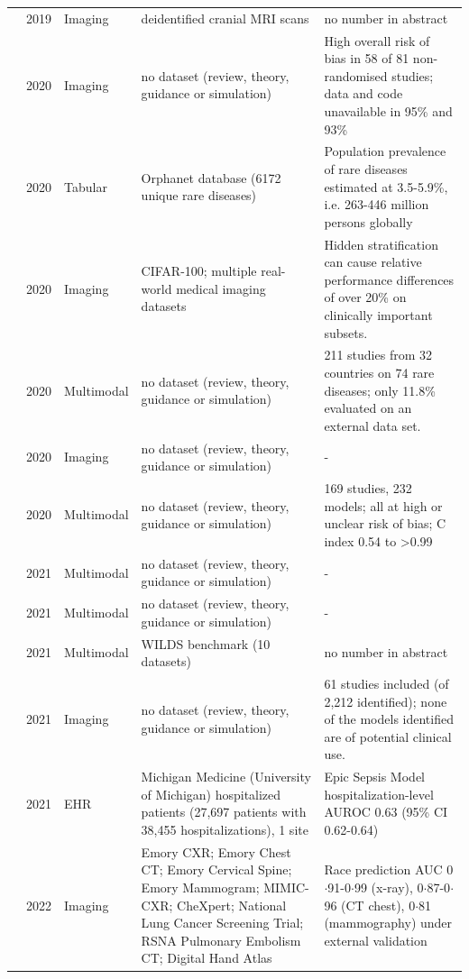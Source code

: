 \begin{longtable}{@{}p{2.6cm}p{0.7cm}p{1.2cm}p{4.4cm}p{4.6cm}@{}}
\cite{schwarz2019identification} & 2019 & Imaging & deidentified cranial MRI scans & no number in abstract\\
\cite{nagendran2020artificial} & 2020 & Imaging & no dataset (review, theory, guidance or simulation) & High overall risk of bias in 58 of 81 non-randomised studies; data and code unavailable in 95\% and 93\%\\
\cite{nguengangwakap2020estimating} & 2020 & Tabular & Orphanet database (6172 unique rare diseases) & Population prevalence of rare diseases estimated at 3.5-5.9\%, i.e. 263-446 million persons globally\\
\cite{oakdenrayner2020hidden} & 2020 & Imaging & CIFAR-100; multiple real-world medical imaging datasets & Hidden stratification can cause relative performance differences of over 20\% on clinically important subsets.\\
\cite{schaefer2020use} & 2020 & Multimodal & no dataset (review, theory, guidance or simulation) & 211 studies from 32 countries on 74 rare diseases; only 11.8\% evaluated on an external data set.\\
\cite{willemink2020preparing} & 2020 & Imaging & no dataset (review, theory, guidance or simulation) & -\\
\cite{wynants2020prediction} & 2020 & Multimodal & no dataset (review, theory, guidance or simulation) & 169 studies, 232 models; all at high or unclear risk of bias; C index 0.54 to >0.99\\
\cite{chen2021ethical} & 2021 & Multimodal & no dataset (review, theory, guidance or simulation) & -\\
\cite{finlayson2021clinician} & 2021 & Multimodal & no dataset (review, theory, guidance or simulation) & -\\
\cite{koh2021wilds} & 2021 & Multimodal & WILDS benchmark (10 datasets) & no number in abstract\\
\cite{roberts2021common} & 2021 & Imaging & no dataset (review, theory, guidance or simulation) & 61 studies included (of 2,212 identified); none of the models identified are of potential clinical use.\\
\cite{wong2021external} & 2021 & EHR & Michigan Medicine (University of Michigan) hospitalized patients (27,697 patients with 38,455 hospitalizations), 1 site & Epic Sepsis Model hospitalization-level AUROC 0.63 (95\% CI 0.62-0.64)\\
\cite{gichoya2022ai} & 2022 & Imaging & Emory CXR; Emory Chest CT; Emory Cervical Spine; Emory Mammogram; MIMIC-CXR; CheXpert; National Lung Cancer Screening Trial; RSNA Pulmonary Embolism CT; Digital Hand Atlas & Race prediction AUC 0$\cdot$91-0$\cdot$99 (x-ray), 0$\cdot$87-0$\cdot$96 (CT chest), 0$\cdot$81 (mammography) under external validation\\

\end{longtable}
